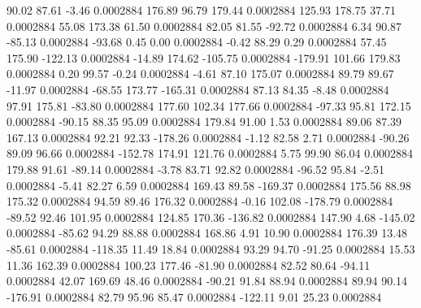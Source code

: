        90.02       87.61       -3.46     0.0002884
      176.89       96.79      179.44     0.0002884
      125.93      178.75       37.71     0.0002884
       55.08      173.38       61.50     0.0002884
       82.05       81.55      -92.72     0.0002884
        6.34       90.87      -85.13     0.0002884
      -93.68        0.45        0.00     0.0002884
       -0.42       88.29        0.29     0.0002884
       57.45      175.90     -122.13     0.0002884
      -14.89      174.62     -105.75     0.0002884
     -179.91      101.66      179.83     0.0002884
        0.20       99.57       -0.24     0.0002884
       -4.61       87.10      175.07     0.0002884
       89.79       89.67      -11.97     0.0002884
      -68.55      173.77     -165.31     0.0002884
       87.13       84.35       -8.48     0.0002884
       97.91      175.81      -83.80     0.0002884
      177.60      102.34      177.66     0.0002884
      -97.33       95.81      172.15     0.0002884
      -90.15       88.35       95.09     0.0002884
      179.84       91.00        1.53     0.0002884
       89.06       87.39      167.13     0.0002884
       92.21       92.33     -178.26     0.0002884
       -1.12       82.58        2.71     0.0002884
      -90.26       89.09       96.66     0.0002884
     -152.78      174.91      121.76     0.0002884
        5.75       99.90       86.04     0.0002884
      179.88       91.61      -89.14     0.0002884
       -3.78       83.71       92.82     0.0002884
      -96.52       95.84       -2.51     0.0002884
       -5.41       82.27        6.59     0.0002884
      169.43       89.58     -169.37     0.0002884
      175.56       88.98      175.32     0.0002884
       94.59       89.46      176.32     0.0002884
       -0.16      102.08     -178.79     0.0002884
      -89.52       92.46      101.95     0.0002884
      124.85      170.36     -136.82     0.0002884
      147.90        4.68     -145.02     0.0002884
      -85.62       94.29       88.88     0.0002884
      168.86        4.91       10.90     0.0002884
      176.39       13.48      -85.61     0.0002884
     -118.35       11.49       18.84     0.0002884
       93.29       94.70      -91.25     0.0002884
       15.53       11.36      162.39     0.0002884
      100.23      177.46      -81.90     0.0002884
       82.52       80.64      -94.11     0.0002884
       42.07      169.69       48.46     0.0002884
      -90.21       91.84       88.94     0.0002884
       89.94       90.14     -176.91     0.0002884
       82.79       95.96       85.47     0.0002884
     -122.11        9.01       25.23     0.0002884
